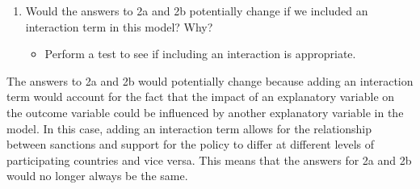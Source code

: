 \documentclass[12pt,letterpaper]{article}
\begin{document}
\begin{enumerate}
\begin{enumerate}
		\vspace{.5cm}
	
		\noindent To find the estimated probability that an individual will support a policy if there are 80 of 192 countries participating with no sanctions the probability formula was used in which the \begin{math} probability = \frac{exp(\beta0 + \beta1X_{i}}{1 + exp(\beta0 + \beta1X_{i})}) \end{math}
	
		\noindent The coefficients from the additive model summary were substituted into the equation. However, as no sanctions is the reference category, there is no coefficient for it and its effect is absorbed into the intercept. Therefore, the equation is \begin{math} probability = \frac{exp(-0.27266 + 0.33636 * 1}{1 + exp(-0.27266 + 0.33636 * 1)}) \end{math}
	
		
	
	\begin{verbatim}
	[1] 0.5159196
	\end{verbatim}
	
	\noindent The probability that an individual will support a policy if there are 80 of 192 countries participating with no sanctions is approximately 51.59 percent.
	
	\end{enumerate}
	
	\section*{Question 3}
	
	\item
	Would the answers to 2a and 2b potentially change if we included an interaction term in this model? Why?
	
		\begin{itemize}
		\item Perform a test to see if including an interaction is appropriate.
	\end{itemize}
	\end{enumerate}
	
	\noindent The answers to 2a and 2b would potentially change because adding an interaction term would account for the fact that the impact of an explanatory variable on the outcome variable could be influenced by another explanatory variable in the model. In this case, adding an interaction term allows for the relationship between sanctions and support for the policy to differ at different levels of participating countries and vice versa. This means that the answers for 2a and 2b would no longer always be the same.
	
\end{document}
